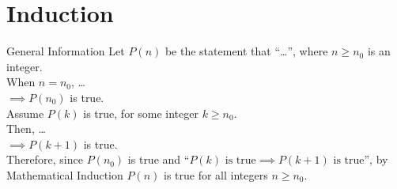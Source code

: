 \documentclass[oneside]{book}
\begin{document}
\chapter{Induction}
\begin{stbox}{General Information}
  Let \(P(n)\) be the statement that ``\ldots'', where \(n\geq n_0\) is an integer.\\[3mm] 
  When \(n=n_0\), \ldots\\[3mm]
  \(\implies P(n_0)\) is true.\\[3mm]
  Assume \(P(k)\) is true, for some integer \(k\geq n_0\).\\[3mm]
  Then, \ldots\\[3mm]
  \(\implies P(k+1)\) is true.\\[3mm]
  Therefore, since \(P(n_0)\) is true and ``\(P(k)\text{ is true}\implies P(k+1)\text{ is true}\)'', by Mathematical Induction \(P(n)\) is true for all integers \(n\geq n_0\).
\end{stbox}
\end{document}
